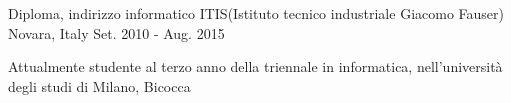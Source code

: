 

\begin{cventries}

  \cventry
    {Diploma, indirizzo informatico} %
    {ITIS(Istituto tecnico industriale Giacomo Fauser)} %
    {Novara, Italy} %
    {Set. 2010 - Aug. 2015} %
    {
      \begin{cvitems} %
        \item {Attualmente studente al terzo anno della triennale in informatica, nell'università degli studi di Milano, Bicocca}
      \end{cvitems}
    }

\end{cventries}
